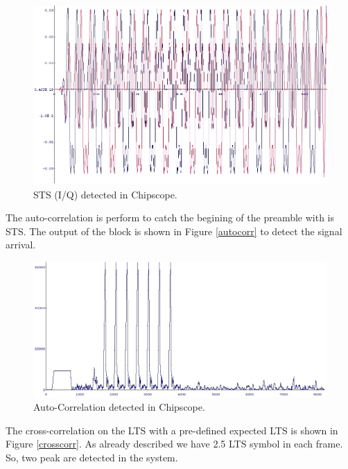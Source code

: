 \begin{figure}
\centering
\includegraphics[width=12cm]{content/fig/sts_chipscope.JPG}
\caption{STS (I/Q) detected in Chipscope.}
\label{fig:sts_chipscope}
\end{figure}

The auto-correlation is perform to catch the begining of the preamble with is STS. The output of the block is shown in Figure \ref{autocorr} to detect the signal arrival.\\

\begin{figure}
\centering
\includegraphics[width=\textwidth]{content/fig/autocorr.JPG}
\caption{Auto-Correlation detected in Chipscope.}
\label{fig:autocorr}
\end{figure}

The cross-correlation on the LTS with a pre-defined expected LTS is shown in Figure \ref{crosscorr}. As already described we have 2.5 LTS symbol in each frame. So, two peak are detected in the system.\\


